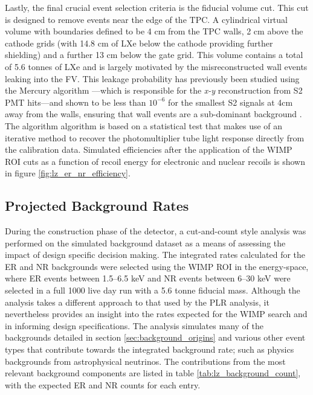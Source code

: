 Lastly, the final crucial event selection criteria is the fiducial volume cut. This cut is designed to remove events near the edge of the TPC. A cylindrical virtual volume with boundaries defined to be 4 cm from the TPC walls, 2 cm above the cathode grids (with 14.8 cm of LXe below the cathode providing further shielding) and a further 13 cm below the gate grid. This volume contains a total of 5.6 tonnes of LXe and is largely motivated by the misreconstructed wall events leaking into the FV. This leakage probability has previously been studied using the Mercury algorithm \cite{Akerib_2018_lux_mercury}---which is responsible for the \textit{x-y} reconstruction from S2 PMT hits---and shown to be less than $10^{-6}$ for the smallest S2 signals at 4cm away from the walls, ensuring that wall events are a sub-dominant background \cite{Akerib_2018_lux_mercury}. The algorithm algorithm is based on a
statistical test that makes use of an iterative method to recover the photomultiplier tube
light response directly from the calibration data. Simulated efficiencies after the application of the WIMP ROI cuts as a function of recoil energy for electronic and nuclear recoils is shown in figure \ref{fig:lz_er_nr_efficiency}.


\subsection{Projected Background Rates}
\label{secsec:background_table}

During the construction phase of the detector, a cut-and-count style analysis was performed on the simulated background dataset as a means of assessing the impact of design specific decision making. The integrated rates calculated for the ER and NR backgrounds were selected using the WIMP ROI in the energy-space, where ER events between 1.5–6.5 keV and NR events between 6–30 keV were selected in a full 1000 live day run with a 5.6 tonne fiducial mass. Although the analysis takes a different approach to that used by the PLR analysis, it nevertheless provides an insight into the rates expected for the WIMP search and in informing design specifications. The analysis simulates many of the backgrounds detailed in section \ref{sec:background_origins} and various other event types that contribute towards the integrated background rate; such as physics backgrounds from astrophysical neutrinos. The contributions from the most relevant background components are listed in table \ref{tab:lz_background_count}, with the expected ER and NR counts for each entry. 

